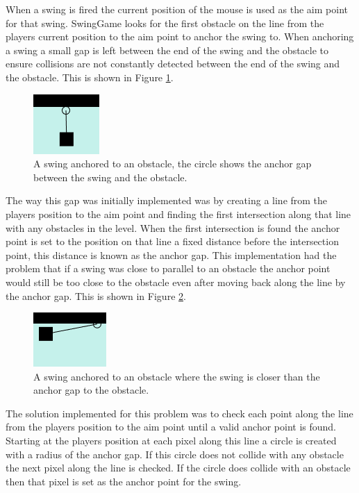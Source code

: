 \documentclass[]{report}
\begin{document}
			When a swing is fired the current position of the mouse is used as the aim point for that swing. SwingGame looks for the first obstacle on the line from the players current position to the aim point to anchor the swing to. When anchoring a swing a small gap is left between the end of the swing and the obstacle to ensure collisions are not constantly detected between the end of the swing and the obstacle. This is shown in Figure \ref{anchorGap}.
			
			\begin{figure}[H]
				\centering
				\includegraphics{anchorGap}
				\caption{A swing anchored to an obstacle, the circle shows the anchor gap between the swing and the obstacle.}
				\label{anchorGap}
			\end{figure}
			
			The way this gap was initially implemented was by creating a line from the players position to the aim point and finding the first intersection along that line with any obstacles in the level. When the first intersection is found the anchor point is set to the position on that line a fixed distance before the intersection point, this distance is known as the anchor gap. This implementation had the problem that if a swing was close to parallel to an obstacle the anchor point would still be too close to the obstacle even after moving back along the line by the anchor gap. This is shown in Figure \ref{anchorProblem}.
			
			\begin{figure}[H]
				\centering
				\includegraphics{anchorProblem}
				\caption{A swing anchored to an obstacle where the swing is closer than the anchor gap to the obstacle.}
				\label{anchorProblem}
			\end{figure}
			
			The solution implemented for this problem was to check each point along the line from the players position to the aim point until a valid anchor point is found. Starting at the players position at each pixel along this line a circle is created with a radius of the anchor gap. If this circle does not collide with any obstacle the next pixel along the line is checked. If the circle does collide with an obstacle then that pixel is set as the anchor point for the swing.
			
\end{document}
